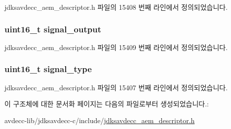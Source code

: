 jdksavdecc\+\_\+aem\+\_\+descriptor.\+h 파일의 15408 번째 라인에서 정의되었습니다.

\subsubsection[{\texorpdfstring{signal\+\_\+output}{signal_output}}]{\setlength{\rightskip}{0pt plus 5cm}uint16\+\_\+t signal\+\_\+output}\hypertarget{structjdksavdecc__descriptor__internal__port_ab4b91864e6fc335d7e86536d9f4461e4}{}\label{structjdksavdecc__descriptor__internal__port_ab4b91864e6fc335d7e86536d9f4461e4}


jdksavdecc\+\_\+aem\+\_\+descriptor.\+h 파일의 15409 번째 라인에서 정의되었습니다.

\subsubsection[{\texorpdfstring{signal\+\_\+type}{signal_type}}]{\setlength{\rightskip}{0pt plus 5cm}uint16\+\_\+t signal\+\_\+type}\hypertarget{structjdksavdecc__descriptor__internal__port_a248e60ef99d5ed1779989d1dd6b6dc5a}{}\label{structjdksavdecc__descriptor__internal__port_a248e60ef99d5ed1779989d1dd6b6dc5a}


jdksavdecc\+\_\+aem\+\_\+descriptor.\+h 파일의 15407 번째 라인에서 정의되었습니다.



이 구조체에 대한 문서화 페이지는 다음의 파일로부터 생성되었습니다.\+:\begin{DoxyCompactItemize}
\item 
avdecc-\/lib/jdksavdecc-\/c/include/\hyperlink{jdksavdecc__aem__descriptor_8h}{jdksavdecc\+\_\+aem\+\_\+descriptor.\+h}\end{DoxyCompactItemize}
